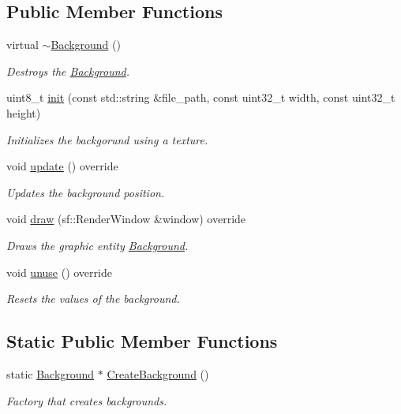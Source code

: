 \subsection*{Public Member Functions}
\begin{DoxyCompactItemize}
\item 
virtual \hyperlink{class_background_a8e03d13cc66a276ebd4ec1e6fc9e8c98}{$\sim$\+Background} ()
\begin{DoxyCompactList}\small\item\em Destroys the \hyperlink{class_background}{Background}. \end{DoxyCompactList}\item 
uint8\+\_\+t \hyperlink{class_background_ae4ae960cd876ef4a2f9fb6e0a7e8bc73}{init} (const std\+::string \&file\+\_\+path, const uint32\+\_\+t width, const uint32\+\_\+t height)
\begin{DoxyCompactList}\small\item\em Initializes the backgorund using a texture. \end{DoxyCompactList}\item 
void \hyperlink{class_background_af4a37c0ac474de5f65130cbef3d61379}{update} () override
\begin{DoxyCompactList}\small\item\em Updates the background position. \end{DoxyCompactList}\item 
void \hyperlink{class_background_a257183f6d077bbee005760813dbb0592}{draw} (sf\+::\+Render\+Window \&window) override
\begin{DoxyCompactList}\small\item\em Draws the graphic entity \hyperlink{class_background}{Background}. \end{DoxyCompactList}\item 
void \hyperlink{class_background_ad3559e8684aca155ae68d53374f3540d}{unuse} () override
\begin{DoxyCompactList}\small\item\em Resets the values of the background. \end{DoxyCompactList}\end{DoxyCompactItemize}
\subsection*{Static Public Member Functions}
\begin{DoxyCompactItemize}
\item 
static \hyperlink{class_background}{Background} $\ast$ \hyperlink{class_background_aafc5996195781b2d4bff7d170792425d}{Create\+Background} ()
\begin{DoxyCompactList}\small\item\em Factory that creates backgrounds. \end{DoxyCompactList}\end{DoxyCompactItemize}

